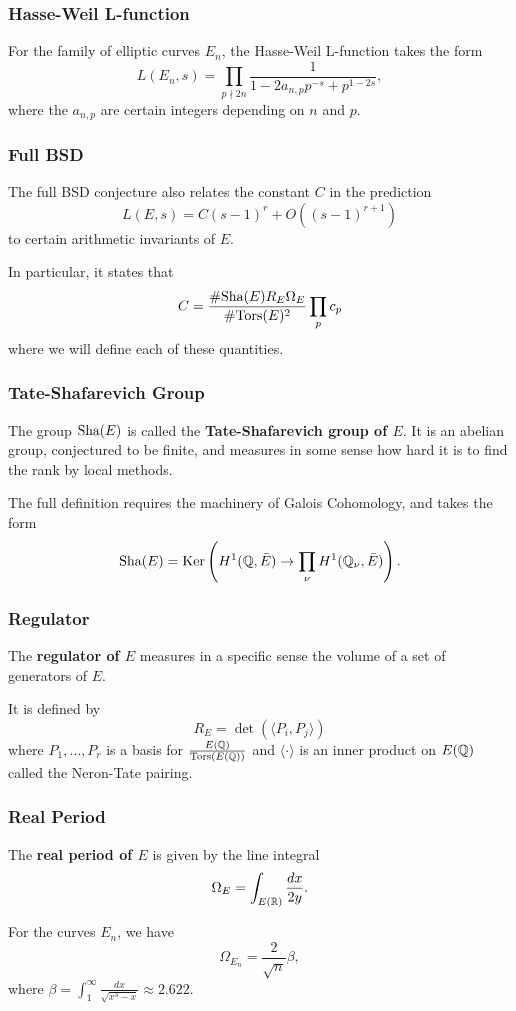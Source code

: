 \message{ !name(presentation.tex)}\documentclass{beamer}
\begin{document}
\begin{frame}
  \frametitle{Hasse-Weil L-function}
  For the family of elliptic curves $E_n$, the Hasse-Weil L-function takes the
  form
  \[L(E_n, s) = \prod\limits_{p \nmid 2n} \frac{1}{1 - 2a_{n,p}p^{-s} + p^{1-2s}},\]
  where the $a_{n,p}$ are certain integers depending on $n$ and $p$.
\end{frame}

\begin{frame}
  \frametitle{Full BSD}
  The full BSD conjecture also relates the constant $C$ in the prediction
  \[L(E,s) = C(s-1)^r + O((s-1)^{r+1})\]
  to certain arithmetic invariants of $E$. \pause
  \bigskip

  In particular, it states that
  \[C = \frac{\# \text{\normalfont Sha}(E) R_E \Omega_E}{\# {\text{\normalfont Tors}}(E)^2} \prod\limits_p c_p\]
  where we will define each of these quantities.
\end{frame}

\begin{frame}
  \frametitle{Tate-Shafarevich Group}
  The group $\text{\normalfont Sha}(E)$ is called the \textbf{Tate-Shafarevich group of $E$}. It
  is an abelian group, conjectured to be finite, and measures in some sense how
  hard it is to find the rank by local methods. \pause
  \bigskip
  
  The full definition requires the machinery of Galois Cohomology, and takes the
  form
  \[\text{\normalfont Sha}(E) = \textnormal{Ker} \left( H^1({\mathbb Q},\bar{E}) \rightarrow \prod\limits_\nu
    H^1({\mathbb Q}_\nu, \bar{E})\right).\]
\end{frame}

\begin{frame}
  \frametitle{Regulator}
  The \textbf{regulator of $E$} measures in a specific sense the volume of a set
  of generators of $E$. \pause
  \bigskip

  It is defined by
  \[R_E = \det \left( \langle P_i, P_j \rangle \right)\]
  where $P_1, \dots, P_r$ is a basis for $\frac{E({\mathbb Q})}{{\text{\normalfont Tors}}(E({\mathbb Q}))}$ and
  $\langle \cdot \rangle$ is an inner product on $E({\mathbb Q})$ called the Neron-Tate pairing.
\end{frame}

\begin{frame}
  \frametitle{Real Period}
  The \textbf{real period of $E$} is given by the line integral
  \[\Omega_E = \int_{E({\mathbb R})} \frac{dx}{2y}.\]

  For the curves $E_n$, we have
  \[\Omega_{E_n} = \frac{2}{\sqrt{n}} \beta,\]
  where $\beta = \int_1^\infty \frac{dx}{\sqrt{x^3-x}} \approx 2.622.$
\end{frame}
\end{document}
